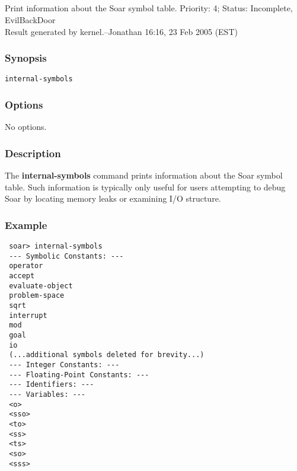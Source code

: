 \subsection{}
\label{internal-symbols}
Print information about the Soar symbol table. 
 Priority: 4; Status: Incomplete, EvilBackDoor\\ 
Result generated by kernel.--Jonathan 16:16, 23 Feb 2005 (EST) 
\subsubsection*{Synopsis}
\begin{verbatim}
internal-symbols
\end{verbatim}
\subsubsection*{Options}
 No options. 
\subsubsection*{Description}
 The \textbf{internal-symbols}
 command prints information about the Soar symbol table. Such information is typically only useful for users attempting to debug Soar by locating memory leaks or examining I/O structure. 
\subsubsection*{Example}
\begin{verbatim}
 soar> internal-symbols
 --- Symbolic Constants: ---
 operator
 accept
 evaluate-object
 problem-space
 sqrt
 interrupt
 mod
 goal
 io
 (...additional symbols deleted for brevity...)
 --- Integer Constants: ---
 --- Floating-Point Constants: ---
 --- Identifiers: ---
 --- Variables: ---  
 <o>
 <sso>
 <to>
 <ss>
 <ts>
 <so>
 <sss>
\end{verbatim}
